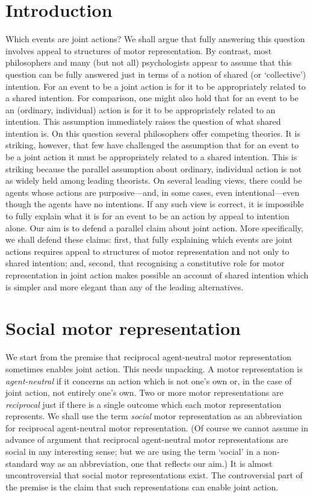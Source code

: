 \documentclass[12pt,\papersize]{extarticle}
\begin{document}
\section{Introduction}
Which events are joint actions?
We shall argue that fully answering this question involves appeal to structures of motor representation.
By contrast, 
most philosophers and many (but not all) psychologists appear to assume that this question can be fully answered just in terms of a notion of shared (or `collective') intention.
For an event to be a joint action is for it to be appropriately related to a shared intention.
For comparison, one might also hold that for an event to be an (ordinary, individual) action is for it to be appropriately related to an intention.
This assumption immediately raises the question of what shared intention is.
On this question several philosophers offer competing theories.
It is striking, however, that few have challenged the assumption that for an event to be a joint action it must be appropriately related to a shared intention.
This is striking because the parallel assumption about ordinary, individual action is not as widely held among leading theorists.
On several leading views, there could be agents whose actions are purposive---and, in some cases, even intentional---even though the agents have no intentions.
If any such view is correct, it is impossible to fully explain what it is for an event to be an action by appeal to intention alone.
Our aim is to defend a parallel claim about joint action.
More specifically, we shall defend these claims: 
first, 
that fully explaining which events are joint actions requires appeal to structures of motor representation and not only to shared intention;
and, 
second, 
that recognising a constitutive role for motor representation in joint action makes possible an account of shared intention which is simpler and more elegant than any of the leading alternatives.



\section{Social motor representation}
We start from the premise that reciprocal agent-neutral motor representation sometimes enables joint action.
This needs unpacking.
A motor representation is \emph{agent-neutral} if it concerns an action which is not one’s own or, in the case of joint action, not entirely one’s own.
Two or more motor representations are \emph{reciprocal} just if there is a single outcome which each motor representation represents.
We shall use the term \emph{social} motor representation as an abbreviation for reciprocal agent-neutral motor representation.
(Of course we cannot assume in advance of argument that reciprocal agent-neutral motor representations are social in any interesting sense;
but we are using the term `social' in a non-standard way as an abbreviation, one that reflects our aim.)
It is almost uncontroversial that social motor representations exist.
The controversial part of the premise is the claim that such representations can enable joint action.
\end{document}
